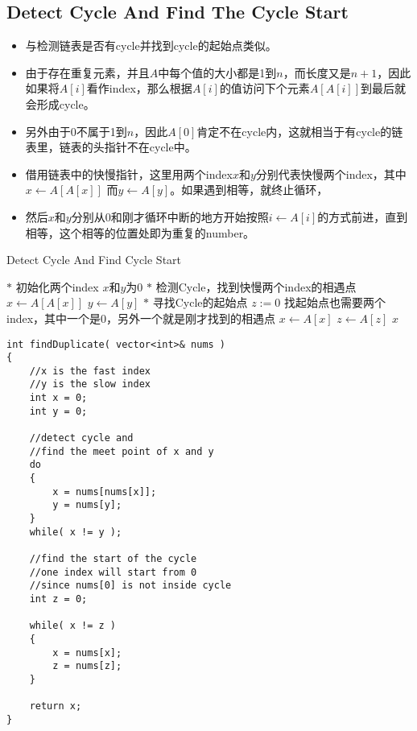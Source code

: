 \subsection{Detect Cycle And Find The Cycle Start}
\begin{itemize}
\item 与检测链表是否有cycle并找到cycle的起始点类似。
\item 由于存在重复元素，并且$A$中每个值的大小都是1到$n$，而长度又是$n+1$，因此如果将$A[i]$看作index，那么根据$A[i]$的值访问下个元素$A[A[i]]$到最后就会形成cycle。
\item 另外由于0不属于1到$n$，因此$A[0]$肯定不在cycle内，这就相当于有cycle的链表里，链表的头指针不在cycle中。
\item 借用链表中的快慢指针，这里用两个index$x$和$y$分别代表快慢两个index，其中$x\gets A[A[x]]$ 而$y\gets A[y]$。如果遇到相等，就终止循环，
\item 然后$x$和$y$分别从0和刚才循环中断的地方开始按照$i\gets A[i]$的方式前进，直到相等，这个相等的位置处即为重复的number。
\end{itemize}
\setcounter{algorithm}{0}
\begin{algorithm}[H]
\caption{Detect Cycle And Find Cycle Start}
\begin{algorithmic}[1]
\State $\ast$ 初始化两个index $x$和$y$为0
\State $\ast$ 检测Cycle，找到快慢两个index的相遇点
\Repeat
\State $x\gets A[A[x]]$
\State $y\gets A[y]$
\State $\ast$ 寻找Cycle的起始点
\State $z:=0$ \Comment 找起始点也需要两个index，其中一个是0，另外一个就是刚才找到的相遇点
\Repeat
\State $x\gets A[x]$
\State $z\gets A[z]$
\State \Return $x$
\EndProcedure
\end{algorithmic}
\end{algorithm}
\setcounter{lstlisting}{0}
\begin{lstlisting}[style=customc, caption={Detect Cycle And Find Cycle Start}]
int findDuplicate( vector<int>& nums )
{
    //x is the fast index
    //y is the slow index
    int x = 0;
    int y = 0;

    //detect cycle and
    //find the meet point of x and y
    do
    {
        x = nums[nums[x]];
        y = nums[y];
    }
    while( x != y );

    //find the start of the cycle
    //one index will start from 0
    //since nums[0] is not inside cycle
    int z = 0;

    while( x != z )
    {
        x = nums[x];
        z = nums[z];
    }

    return x;
}
\end{lstlisting}
